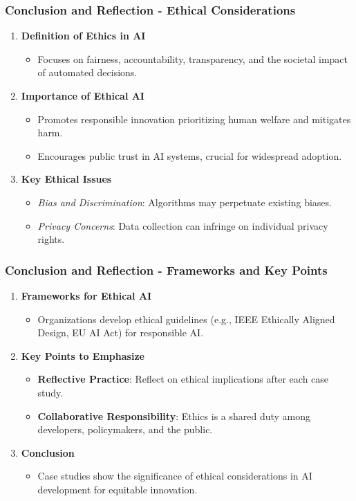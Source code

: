 \documentclass[aspectratio=169]{beamer}
\begin{document}
\begin{frame}[fragile]
    \frametitle{Conclusion and Reflection - Ethical Considerations}
    \begin{enumerate}
        \item \textbf{Definition of Ethics in AI}
            \begin{itemize}
                \item Focuses on fairness, accountability, transparency, and the societal impact of automated decisions.
            \end{itemize}
        \item \textbf{Importance of Ethical AI}
            \begin{itemize}
                \item Promotes responsible innovation prioritizing human welfare and mitigates harm.
                \item Encourages public trust in AI systems, crucial for widespread adoption.
            \end{itemize}
        \item \textbf{Key Ethical Issues}
            \begin{itemize}
                \item \textit{Bias and Discrimination}: Algorithms may perpetuate existing biases.
                \item \textit{Privacy Concerns}: Data collection can infringe on individual privacy rights.
            \end{itemize}
    \end{enumerate}
\end{frame}

\begin{frame}[fragile]
    \frametitle{Conclusion and Reflection - Frameworks and Key Points}
    \begin{enumerate}
        \item \textbf{Frameworks for Ethical AI}
            \begin{itemize}
                \item Organizations develop ethical guidelines (e.g., IEEE Ethically Aligned Design, EU AI Act) for responsible AI.
            \end{itemize}
        \item \textbf{Key Points to Emphasize}
            \begin{itemize}
                \item \textbf{Reflective Practice}: Reflect on ethical implications after each case study.
                \item \textbf{Collaborative Responsibility}: Ethics is a shared duty among developers, policymakers, and the public.
            \end{itemize}
        \item \textbf{Conclusion}
            \begin{itemize}
                \item Case studies show the significance of ethical considerations in AI development for equitable innovation.
            \end{itemize}
    \end{enumerate}
\end{frame}
\end{document}
